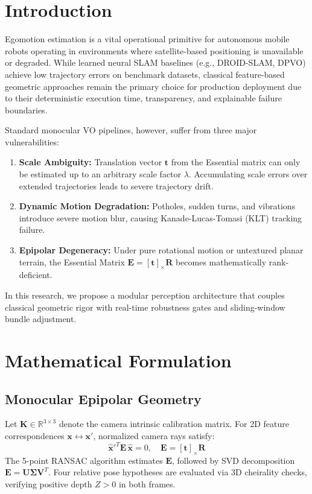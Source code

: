\documentclass[conference]{IEEEtran}
\begin{document}
\section{Introduction}
Egomotion estimation is a vital operational primitive for autonomous mobile robots operating in environments where satellite-based positioning is unavailable or degraded. While learned neural SLAM baselines (e.g., DROID-SLAM, DPVO) achieve low trajectory errors on benchmark datasets, classical feature-based geometric approaches remain the primary choice for production deployment due to their deterministic execution time, transparency, and explainable failure boundaries.

Standard monocular VO pipelines, however, suffer from three major vulnerabilities:
\begin{enumerate}
    \item \textbf{Scale Ambiguity:} Translation vector $\mathbf{t}$ from the Essential matrix can only be estimated up to an arbitrary scale factor $\lambda$. Accumulating scale errors over extended trajectories leads to severe trajectory drift.
    \item \textbf{Dynamic Motion Degradation:} Potholes, sudden turns, and vibrations introduce severe motion blur, causing Kanade-Lucas-Tomasi (KLT) tracking failure.
    \item \textbf{Epipolar Degeneracy:} Under pure rotational motion or untextured planar terrain, the Essential Matrix $\mathbf{E} = [\mathbf{t}]_\times \mathbf{R}$ becomes mathematically rank-deficient.
\end{enumerate}

In this research, we propose a modular perception architecture that couples classical geometric rigor with real-time robustness gates and sliding-window bundle adjustment.

\section{Mathematical Formulation}

\subsection{Monocular Epipolar Geometry}
Let $\mathbf{K} \in \mathbb{R}^{3 \times 3}$ denote the camera intrinsic calibration matrix. For 2D feature correspondences $\mathbf{x} \leftrightarrow \mathbf{x}'$, normalized camera rays satisfy:
\begin{equation}
\hat{\mathbf{x}}'^T \mathbf{E} \, \hat{\mathbf{x}} = 0, \quad \mathbf{E} = [\mathbf{t}]_\times \mathbf{R}
\end{equation}
The 5-point RANSAC algorithm estimates $\mathbf{E}$, followed by SVD decomposition $\mathbf{E} = \mathbf{U} \mathbf{\Sigma} \mathbf{V}^T$. Four relative pose hypotheses are evaluated via 3D cheirality checks, verifying positive depth $Z > 0$ in both frames.
\end{document}
